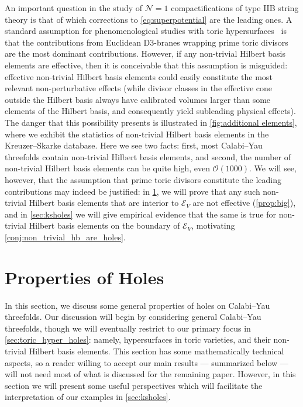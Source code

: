 \documentclass[11pt,dvipsnames]{article}
\theoremstyle{definition}
\begin{document}
An important question in the study of $\mathcal{N}=1$ compactifications of type IIB string theory is that of which corrections to \eqref{eq:superpotential} are the leading ones. A standard assumption for phenomenological studies with toric hypersurfaces~\cite{Demirtas:2018akl, Demirtas:2021gsq, Cheng:2025ggf, Yin:2025amn, Gendler:2023kjt, Gendler:2023hwg, Gendler:2024adn, McAllister:2024lnt, Demirtas:2021ote, Demirtas:2021nlu, Mehta:2021pwf} is that the contributions from Euclidean D3-branes wrapping prime toric divisors are the most dominant contributions. However, if any non-trivial Hilbert basis elements are effective, then it is conceivable that this assumption is misguided: effective non-trivial Hilbert basis elements could easily constitute the most relevant non-perturbative effects (while divisor classes in the effective cone outside the Hilbert basis always have calibrated volumes larger than some elements of the Hilbert basis, and consequently yield subleading physical effects). The danger that this possibility presents is illustrated in \cref{fig:additional elements}, where we exhibit the statistics of non-trivial Hilbert basis elements in the Kreuzer--Skarke database. Here we see two facts: first, most Calabi--Yau threefolds contain non-trivial Hilbert basis elements, and second, the number of non-trivial Hilbert basis elements can be quite high, even $\mathcal{O}(1000)$. We will see, however, that the assumption that prime toric divisors constitute the leading contributions may indeed be justified: in \cref{sec:holeprops}, we will prove that any such non-trivial Hilbert basis elements that are interior to $\mathcal{E}_V$ are not effective (\cref{prop:big}), and in \cref{sec:ksholes} we will give empirical evidence that the same is true for non-trivial Hilbert basis elements on the boundary of $\mathcal{E}_V$, motivating \cref{conj:non_trivial_hb_are_holes}.


\section{Properties of Holes} \label{sec:holeprops}

In this section, we discuss some general properties of holes on Calabi--Yau threefolds. Our discussion will begin by considering general Calabi--Yau threefolds, though we will eventually restrict to our primary focus in \cref{sec:toric_hyper_holes}: namely, hypersurfaces in toric varieties, and their non-trivial Hilbert basis elements. This section has some mathematically technical aspects, so a reader willing to accept our main results --- summarized below --- will not need most of what is discussed for the remaining paper. However, in this section we will present some useful perspectives which will facilitate the interpretation of our examples in \cref{sec:ksholes}. 
\end{document}

